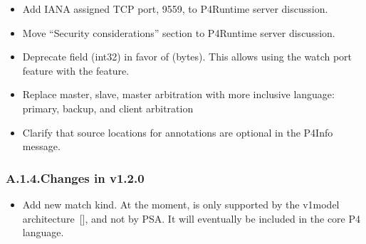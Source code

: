 \documentclass[11pt]{article}
\begin{document}
{%
\begin{itemize}[noitemsep,topsep=\mdcompacttopsep]%

\item{}Add IANA assigned TCP port, 9559, to P4Runtime server discussion.%

\item{}Move \textquotedblleft{}Security considerations\textquotedblright{} section to P4Runtime server discussion.%

\item{}Deprecate  field (int32) in favor of  (bytes). This allows
using the watch port feature with the  feature.%

\item{}Replace master, slave, master arbitration with more inclusive language:
primary, backup, and client arbitration%

\item{}Clarify that source locations for annotations are optional in the P4Info
message.%
\end{itemize}%

\subsubsection{A.1.4.\hspace*{0.5em}Changes in v1.2.0}\label{sec-changes-in-v120}%

\begin{itemize}[noitemsep,topsep=\mdcompacttopsep]%

\item{}Add new  match kind. At the moment,  is only supported by
the v1model architecture~[], and not by PSA. It will eventually be
included in the core P4 language.%


\end{itemize}}
\end{document}
